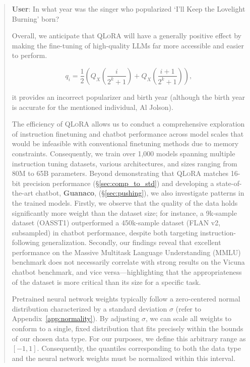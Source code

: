 \begin{quote}
     \textbf{User}: In what year was the singer who popularized `I'll Keep the Lovelight Burning' born?  

Overall, we anticipate that \textsc{QLoRA} will have a generally positive effect by making the fine-tuning of high-quality LLMs far more accessible and easier to perform.

\begin{equation}
q_i  = \frac{1}{2}\left( Q_X\left(\frac{i}{2^k+1}\right) + Q_X\left(\frac{i+1}{2^k+1}\right)\right),
\end{equation}

it provides an incorrect popularizer and birth year (although the birth year is accurate for the mentioned individual, Al Jolson).

The efficiency of \textsc{QLoRA} allows us to conduct a comprehensive exploration of instruction finetuning and chatbot performance across model scales that would be infeasible with conventional finetuning methods due to memory constraints. Consequently, we train over 1,000 models spanning multiple instruction tuning datasets, various architectures, and sizes ranging from 80M to 65B parameters. Beyond demonstrating that \textsc{QLoRA} matches 16-bit precision performance (\S\ref{sec:comp_to_std}) and developing a state-of-the-art chatbot, \textbf{Guanaco}, (\S\ref{sec:pushing}), we also investigate patterns in the trained models. Firstly, we observe that the quality of the data holds significantly more weight than the dataset size; for instance, a 9k-sample dataset (OASST1) outperformed a 450k-sample dataset (FLAN v2, subsampled) in chatbot performance, despite both targeting instruction-following generalization. Secondly, our findings reveal that excellent performance on the Massive Multitask Language Understanding (MMLU) benchmark does not necessarily correlate with strong results on the Vicuna chatbot benchmark, and vice versa—highlighting that the appropriateness of the dataset is more critical than its size for a specific task.

Pretrained neural network weights typically follow a zero-centered normal distribution characterized by a standard deviation $\sigma$ (refer to Appendix~\ref{app:normality}). By adjusting $\sigma$, we can scale all weights to conform to a single, fixed distribution that fits precisely within the bounds of our chosen data type. For our purposes, we define this arbitrary range as $[-1, 1]$. Consequently, the quantiles corresponding to both the data type and the neural network weights must be normalized within this interval.


\end{quote}
